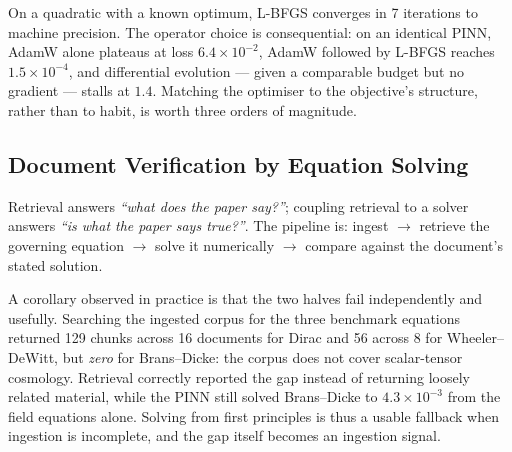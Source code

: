 \documentclass[11pt,a4paper]{article}
\theoremstyle{plain}
\theoremstyle{definition}
\begin{document}
On a quadratic with a known optimum, L-BFGS converges in 7 iterations to
machine precision. The operator choice is consequential: on an identical PINN,
AdamW alone plateaus at loss $6.4\times10^{-2}$, AdamW followed by L-BFGS
reaches $1.5\times10^{-4}$, and differential evolution --- given a comparable
budget but no gradient --- stalls at $1.4$. Matching the optimiser to the
objective's structure, rather than to habit, is worth three orders of
magnitude.

\subsection{Document Verification by Equation Solving}

Retrieval answers \emph{``what does the paper say?''}; coupling retrieval to a
solver answers \emph{``is what the paper says true?''}. The pipeline is:
ingest $\rightarrow$ retrieve the governing equation $\rightarrow$ solve it
numerically $\rightarrow$ compare against the document's stated solution.

A corollary observed in practice is that the two halves fail independently and
usefully. Searching the ingested corpus for the three benchmark equations
returned 129 chunks across 16 documents for Dirac and 56 across 8 for
Wheeler--DeWitt, but \emph{zero} for Brans--Dicke: the corpus does not cover
scalar-tensor cosmology. Retrieval correctly reported the gap instead of
returning loosely related material, while the PINN still solved Brans--Dicke
to $4.3\times10^{-3}$ from the field equations alone. Solving from first
principles is thus a usable fallback when ingestion is incomplete, and the
gap itself becomes an ingestion signal.
\end{document}
